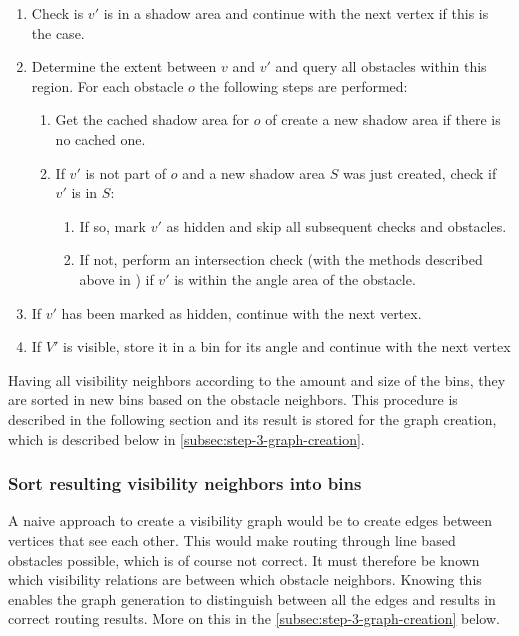 				\begin{enumerate}
					\item Check is $v'$ is in a shadow area and continue with the next vertex if this is the case.
					\item Determine the extent between $v$ and $v'$ and query all obstacles within this region. For each obstacle $o$ the following steps are performed:
					\begin{enumerate}
						\item Get the cached shadow area for $o$ of create a new shadow area if there is no cached one.
						\item If $v'$ is not part of $o$ and a new shadow area $S$ was just created, check if $v'$ is in $S$:
						\begin{enumerate}
							\item If so, mark $v'$ as hidden and skip all subsequent checks and obstacles.
							\item If not, perform an intersection check (with the methods described above in \emph{}) if $v'$ is within the angle area of the obstacle.
						\end{enumerate}
					\end{enumerate}
					\item If $v'$ has been marked as hidden, continue with the next vertex.
					\item If $V'$ is visible, store it in a bin for its angle and continue with the next vertex
				\end{enumerate}
			
				Having all visibility neighbors according to the amount and size of the bins, they are sorted in new bins based on the obstacle neighbors.
				This procedure is described in the following section and its result is stored for the graph creation, which is described below in \cref{subsec:step-3-graph-creation}.
			
			\subsubsection{Sort resulting visibility neighbors into bins}
			
				A naive approach to create a visibility graph would be to create edges between vertices that see each other.
				This would make routing through line based obstacles possible, which is of course not correct.
				It must therefore be known which visibility relations are between which obstacle neighbors.
				Knowing this enables the graph generation to distinguish between all the edges and results in correct routing results.
				More on this in the \cref{subsec:step-3-graph-creation} below.
				
